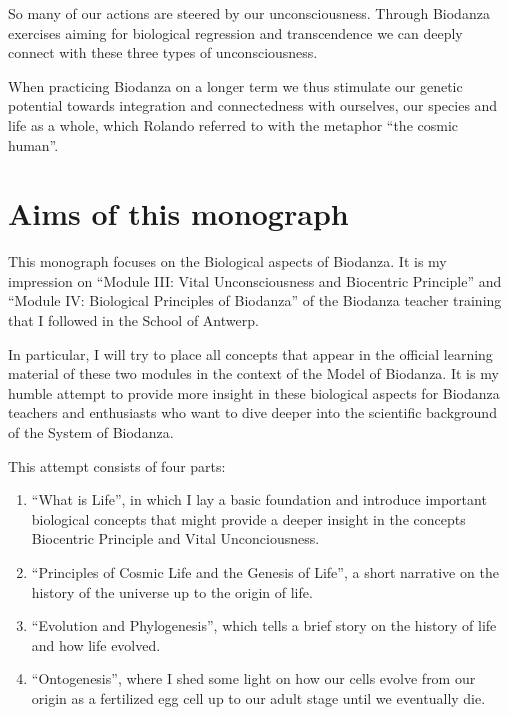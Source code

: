 \documentclass[
  11pt,
]{book}
\begin{document}
So many of our actions are steered by our unconsciousness.
Through Biodanza exercises aiming for biological regression and transcendence we can deeply connect with these three types of unconsciousness.

When practicing Biodanza on a longer term we thus stimulate our genetic potential towards integration and connectedness with ourselves, our species and life as a whole, which Rolando referred to with the metaphor ``the cosmic human''.

\newpage

\hypertarget{aims-of-this-monograph}{%
\section{Aims of this monograph}\label{aims-of-this-monograph}}

This monograph focuses on the Biological aspects of Biodanza. It is my impression on ``Module III: Vital Unconsciousness and Biocentric Principle'' and ``Module IV: Biological Principles of Biodanza'' of the Biodanza teacher training that I followed in the School of Antwerp.

In particular, I will try to place all concepts that appear in the official learning material of these two modules in the context of the Model of Biodanza. It is my humble attempt to provide more insight in these biological aspects for Biodanza teachers and enthusiasts who want to dive deeper into the scientific background of the System of Biodanza.

This attempt consists of four parts:

\begin{enumerate}
\def\labelenumi{\arabic{enumi}.}
\item
  ``What is Life'', in which I lay a basic foundation and introduce important biological concepts that might provide a deeper insight in the concepts Biocentric Principle and Vital Unconciousness.
\item
  ``Principles of Cosmic Life and the Genesis of Life'', a short narrative on the history of the universe up to the origin of life.
\item
  ``Evolution and Phylogenesis'', which tells a brief story on the history of life and how life evolved.
\item
  ``Ontogenesis'', where I shed some light on how our cells evolve from our origin as a fertilized egg cell up to our adult stage until we eventually die.
\end{enumerate}
\end{document}

